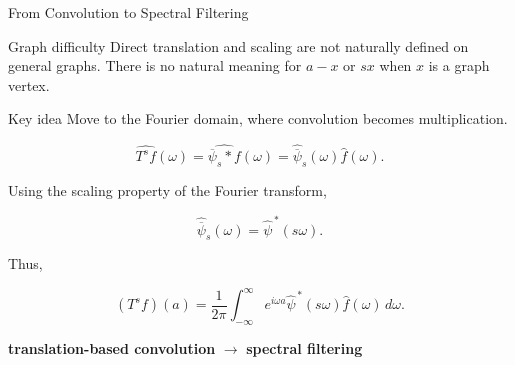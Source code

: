 \documentclass[aspectratio=1610,xcolor=dvipsnames,t]{beamer}
\newcommand{\keyterm}[1]{\textcolor{unirot}{\textbf{#1}}}
\begin{document}
\begin{frame}[t]{From Convolution to Spectral Filtering}

\footnotesize
\setlength{\abovedisplayskip}{3pt}
\setlength{\belowdisplayskip}{3pt}
\setlength{\abovedisplayshortskip}{2pt}
\setlength{\belowdisplayshortskip}{2pt}

\begin{alertblock}{Graph difficulty}
Direct translation and scaling are not naturally defined on general graphs.
There is no natural meaning for $a-x$ or $sx$ when $x$ is a graph vertex.
\end{alertblock}

\vspace{-0.4em}

\begin{block}{Key idea}
Move to the Fourier domain, where convolution becomes multiplication.
\end{block}

\vspace{-0.5em}

\[
\widehat{T^s f}(\omega)
=
\widehat{\overline{\psi}_s*f}(\omega)
=
\widehat{\overline{\psi}}_s(\omega)\widehat{f}(\omega).
\tag{\footnotesize SGWT Eq. 7}
\]

\vspace{-0.3em}

Using the scaling property of the Fourier transform,

\vspace{-0.4em}

\[
\widehat{\overline{\psi}}_s(\omega)
=
\widehat{\psi}^{\,*}(s\omega).
\tag{\footnotesize SGWT Eq. 8}
\]

\vspace{-0.4em}

Thus,

\vspace{-0.4em}

\[
(T^s f)(a)
=
\frac{1}{2\pi}
\int_{-\infty}^{\infty}
e^{i\omega a}
\widehat{\psi}^{\,*}(s\omega)
\widehat{f}(\omega)\,d\omega.
\tag{\footnotesize SGWT Eq. 9}
\]

\vspace{-0.2em}

\begin{center}
\keyterm{translation-based convolution}
\quad$\longrightarrow$\quad
\keyterm{spectral filtering}
\end{center}

\end{frame}
\end{document}

